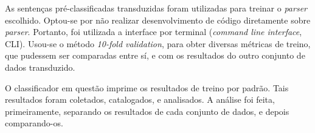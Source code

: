 As sentenças pré-classificadas transduzidas foram utilizadas para treinar o \textit{parser} escolhido. Optou-se por não realizar desenvolvimento de código diretamente sobre \textit{parser}. Portanto, foi utilizada a interface por terminal (\textit{command line interface}, CLI). Usou-se o método \textit{10-fold validation}, para obter diversas métricas de treino, que pudessem ser comparadas entre sí, e com os resultados do outro conjunto de dados transduzido.

O classificador em questão imprime os resultados de treino por padrão. Tais resultados foram coletados, catalogados, e analisados. A análise foi feita, primeiramente, separando os resultados de cada conjunto de dados, e depois comparando-os.